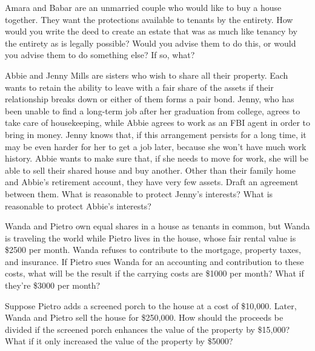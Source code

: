\item Amara and Babar are an unmarried couple who would like to buy a house
together. They want the protections available to tenants by the entirety. How
would you write the deed to create an estate that was as much like tenancy by
the entirety as is legally possible? Would you advise them to do this, or
would you advise them to do something else? If so, what?

\item Abbie and Jenny Mills are sisters who wish to share all their property.
Each wants to retain the ability to leave with a fair share of the assets if
their relationship breaks down or either of them forms a pair bond. Jenny, who
has been unable to find a long-term job after her graduation from college,
agrees to take care of housekeeping, while Abbie agrees to work as an FBI agent
in order to bring in money. Jenny knows that, if this arrangement persists for a
long time, it may be even harder for her to get a job later, because she won't
have much work history. Abbie wants to make sure that, if she needs to move
for work, she will be able to sell their shared house and buy another. Other
than their family home and Abbie's retirement account, they have very few
assets. Draft an agreement between them. What is reasonable to protect
Jenny's interests? What is reasonable to protect Abbie's interests?

\item Wanda and Pietro own equal shares in a house as tenants in common, but
Wanda is traveling the world while Pietro lives in the house, whose fair rental
value is \$2500 per month. Wanda refuses to contribute to the mortgage, property
taxes, and insurance. If Pietro sues Wanda for an accounting and contribution to
these costs, what will be the result if the carrying costs are \$1000 per month?
What if they're \$3000 per month?

Suppose Pietro adds a screened porch to the house at a cost of \$10,000. Later,
Wanda and Pietro sell the house for \$250,000. How should the proceeds be
divided if the screened porch enhances the value of the property by \$15,000?
What if it only increased the value of the property by \$5000?

